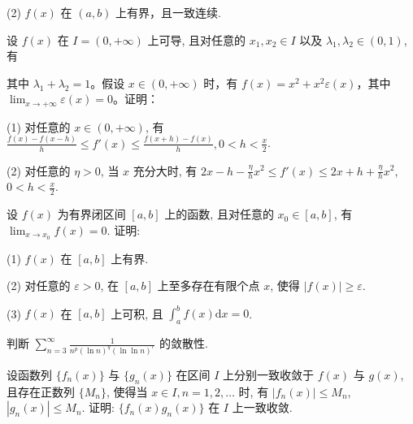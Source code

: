 (2) $f(x)$ 在 $(a, b)$ 上有界，且一致连续.\par
\par{}
\par{}
设 $f(x)$ 在 $I = (0, +\infty)$ 上可导, 且对任意的 $x_{1}, x_{2} \in I$ 以及 $\lambda_{1}, \lambda_{2} \in (0, 1)$, 有\par
\nopagebreak[4]
其中 $\lambda_1 + \lambda_2 = 1$。假设 $x \in (0, +\infty)$ 时，有 $f(x) = x^2 + x^2\varepsilon(x)$，其中 $\lim_{x \to +\infty} \varepsilon(x) = 0$。证明：\par
(1) 对任意的 $x \in (0, +\infty)$, 有 $\frac{f(x) - f(x - h)}{h} \leq f'(x) \leq \frac{f(x + h) - f(x)}{h}, 0 < h < \frac{x}{2}$.\par
(2) 对任意的 $\eta > 0$, 当 $x$ 充分大时, 有 $2x - h - \frac{\eta}{h} x^2 \leq f'(x) \leq 2x + h + \frac{\eta}{h} x^2$, $0 < h < \frac{x}{2}$.\par
\par{}
设 $f(x)$ 为有界闭区间 $[a, b]$ 上的函数, 且对任意的 $x_0 \in [a, b]$, 有 $\lim_{x \to x_0} f(x) = 0$. 证明:\par
(1) $f(x)$ 在 $[a, b]$ 上有界.\par
(2) 对任意的 $\varepsilon > 0$, 在 $[a, b]$ 上至多存在有限个点 $x$, 使得 $|f(x)| \geq \varepsilon$.\par
(3) $f(x)$ 在 $[a, b]$ 上可积, 且 $\int_{a}^{b} f(x) \mathrm{d}x = 0$.\par
\par{}
判断 $\sum_{n=3}^{\infty} \frac{1}{n^{p} (\ln n)^{q} (\ln \ln n)^{r}}$ 的敛散性.\par
\par{}
设函数列 $\{f_n(x)\}$ 与 $\{g_n(x)\}$ 在区间 $I$ 上分别一致收敛于 $f(x)$ 与 $g(x)$, 且存在正数列 $\{M_n\}$, 使得当 $x \in I, n = 1,2,\dots$ 时, 有 $|f_n(x)| \leq M_n$, $|g_n(x)| \leq M_n$. 证明: $\{f_n(x)g_n(x)\}$ 在 $I$ 上一致收敛.\par
